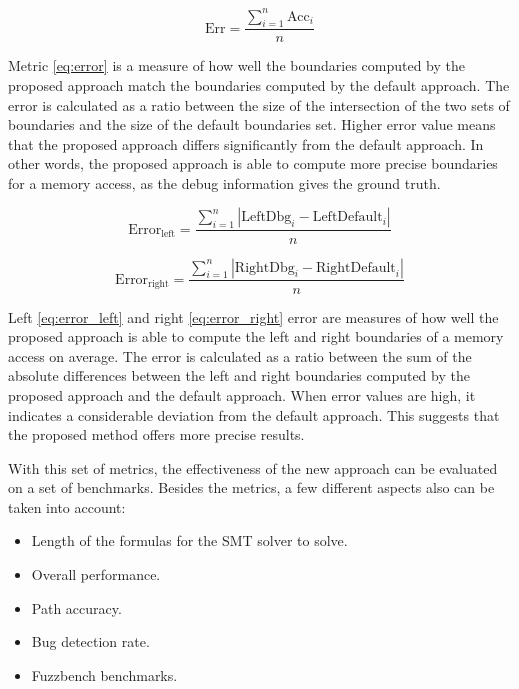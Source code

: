 \documentclass[conference]{IEEEtran}
\begin{document}
\begin{equation}
    \label{eq:error}
    \text{Err}=\frac{\sum_{i=1}^n{\text{Acc}_i}}{n}
\end{equation}

Metric \ref{eq:error} is a measure of how well the boundaries computed by the proposed approach match the boundaries computed by the default approach. The error is calculated as a ratio between the size of the intersection of the two sets of boundaries and the size of the default boundaries set. Higher error value means that the proposed approach differs significantly from the default approach. In other words, the proposed approach is able to compute more precise boundaries for a memory access, as the debug information gives the ground truth.

\begin{equation}
    \label{eq:error_left}
    \text{Error}_\text{left}=\frac{\sum_{i=1}^n{|\text{LeftDbg}_i-\text{LeftDefault}_i|}}{n}
\end{equation}

\begin{equation}
    \label{eq:error_right}
    \text{Error}_\text{right}=\frac{\sum_{i=1}^n{|\text{RightDbg}_i-\text{RightDefault}_i|}}{n}
\end{equation}

Left \ref{eq:error_left} and right \ref{eq:error_right} error are measures of how well the proposed approach is able to compute the left and right boundaries of a memory access on average. The error is calculated as a ratio between the sum of the absolute differences between the left and right boundaries computed by the proposed approach and the default approach. When error values are high, it indicates a considerable deviation from the default approach. This suggests that the proposed method offers more precise results.

With this set of metrics, the effectiveness of the new approach can be evaluated on a set of benchmarks. Besides the metrics, a few different aspects also can be taken into account:

\begin{itemize}
    \item Length of the formulas for the SMT solver to solve.
    \item Overall performance.
    \item Path accuracy.
    \item Bug detection rate.
    \item Fuzzbench benchmarks.
\end{itemize}
\end{document}
